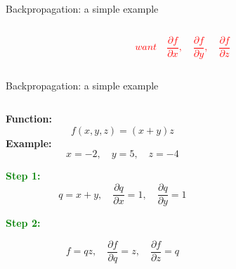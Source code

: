 \documentclass[serif, aspectratio=169]{beamer}
\begin{document}
\begin{frame}{Backpropagation: a simple example}
\begin{columns}
\begin{column}{0.6\textwidth}
\begin{center}
\begin{tikzpicture}[scale=0.9, every node/.style={scale=0.8}]
            \end{tikzpicture}
            \end{center}
            \textcolor{red}{ 
            \[
            want \quad
            \frac{\partial f}{\partial x}, \quad \frac{\partial f}{\partial y}, \quad
            \frac{\partial f}{\partial z}
            \] 
            }
        \end{column}

    \end{columns}

\end{frame}

\begin{frame}{Backpropagation: a simple example}

    \begin{columns}
       
        \begin{column}{0.4\textwidth}
            \vspace{-0.4cm}
            \textbf{Function:} 
            \[
            f(x, y, z) = (x + y)z
            \]
            \textbf{Example:} 
            \[
            x = -2, \quad y = 5, \quad z = -4
            \]
            
            \textcolor{green}{\textbf{Step 1:}}
            \[
             q = x + y, \quad
            \frac{\partial q}{\partial x} = 1, \quad \frac{\partial q}{\partial y} = 1
            \]
            
            \textcolor{green}{\textbf{Step 2:}}

            \[
            f = qz, \quad
            \frac{\partial f}{\partial q} = z, \quad \frac{\partial f}{\partial z} = q
            \]
        \end{column}

        \begin{column}{0.6\textwidth}
            \begin{center}
\end{center}
\end{column}
\end{columns}
\end{frame}
\end{document}
